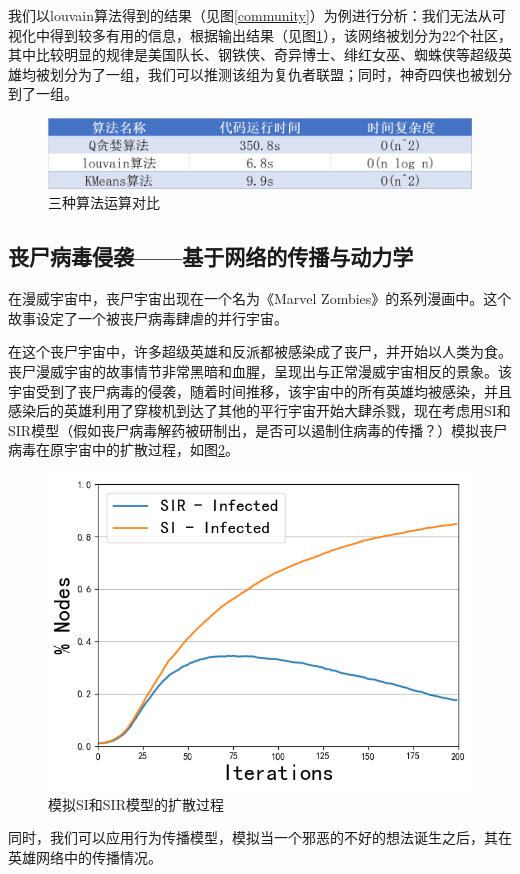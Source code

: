 \documentclass[12pt]{xjtureport}
\begin{document}
我们以louvain算法得到的结果（见图\ref{community}）为例进行分析：我们无法从可视化中得到较多有用的信息，根据输出结果（见图\ref{compare}），该网络被划分为22个社区，其中比较明显的规律是美国队长、钢铁侠、奇异博士、绯红女巫、蜘蛛侠等超级英雄均被划分为了一组，我们可以推测该组为复仇者联盟；同时，神奇四侠也被划分到了一组。


\begin{figure}[!htbp]
    \centering
    \includegraphics[width=0.8\linewidth]{figures/算法复杂度.jpg}
    \caption{三种算法运算对比}
    \label{compare}
\end{figure}

\subsection{丧尸病毒侵袭——基于网络的传播与动力学}

在漫威宇宙中，丧尸宇宙出现在一个名为《Marvel Zombies》的系列漫画中。这个故事设定了一个被丧尸病毒肆虐的并行宇宙。

在这个丧尸宇宙中，许多超级英雄和反派都被感染成了丧尸，并开始以人类为食。丧尸漫威宇宙的故事情节非常黑暗和血腥，呈现出与正常漫威宇宙相反的景象。该宇宙受到了丧尸病毒的侵袭，随着时间推移，该宇宙中的所有英雄均被感染，并且感染后的英雄利用了穿梭机到达了其他的平行宇宙开始大肆杀戮，现在考虑用SI和SIR模型（假如丧尸病毒解药被研制出，是否可以遏制住病毒的传播？）模拟丧尸病毒在原宇宙中的扩散过程，如图\ref{SISIR}。

\begin{figure}[!htbp]
    \centering
    \includegraphics[width=0.5\linewidth]{figures/SI&SIR.png}
    \caption{模拟SI和SIR模型的扩散过程}
    \label{SISIR}
\end{figure}

同时，我们可以应用行为传播模型，模拟当一个邪恶的不好的想法诞生之后，其在英雄网络中的传播情况。
\end{document}
